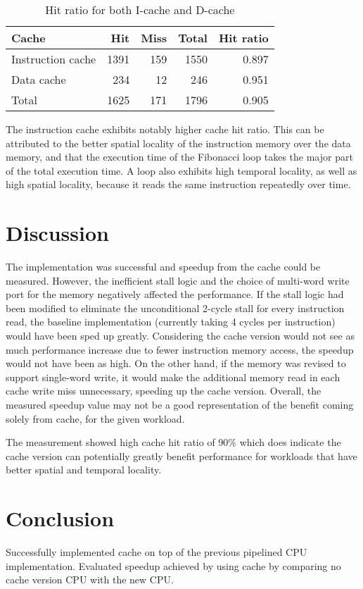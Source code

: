 \documentclass[12pt]{article}
\begin{document}
\begin{table}[ht]
  \centering
  \begin{tabular}{@{}lrrrr@{}} \toprule
    Cache & Hit & Miss & Total & Hit ratio \\ \midrule
    Instruction cache & 1391 & 159 & 1550 & 0.897 \\
    Data cache & 234 & 12 & 246 & 0.951 \\ \midrule
    Total & 1625 & 171 & 1796 & 0.905 \\
    \bottomrule
  \end{tabular}
  \caption{Hit ratio for both I-cache and D-cache}
  \label{table:hitmiss}
\end{table}

The instruction cache exhibits notably higher cache hit ratio.  This
can be attributed to the better spatial locality of the instruction
memory over the data memory, and that the execution time of the
Fibonacci loop takes the major part of the total execution time.  A
loop also exhibits high temporal locality, as well as high spatial
locality, because it reads the same instruction repeatedly over time.

\section{Discussion}
The implementation was successful and speedup from the cache could be
measured.  However, the inefficient stall logic and the choice of
multi-word write port for the memory negatively affected the
performance.  If the stall logic had been modified to eliminate the
unconditional 2-cycle stall for every instruction read, the baseline
implementation (currently taking 4 cycles per instruction) would have
been sped up greatly.  Considering the cache version would not see as
much performance increase due to fewer instruction memory access, the
speedup would not have been as high.  On the other hand, if the memory
was revised to support single-word write, it would make the additional
memory read in each cache write miss unnecessary, speeding up the
cache version.  Overall, the measured speedup value may not be a good
representation of the benefit coming solely from cache, for the given
workload.

The measurement showed high cache hit ratio of 90\% which does
indicate the cache version can potentially greatly benefit performance
for workloads that have better spatial and temporal locality.

\section{Conclusion}
Successfully implemented cache on top of the previous pipelined CPU
implementation.  Evaluated speedup achieved by using cache by
comparing no cache version CPU with the new CPU.
\end{document}
